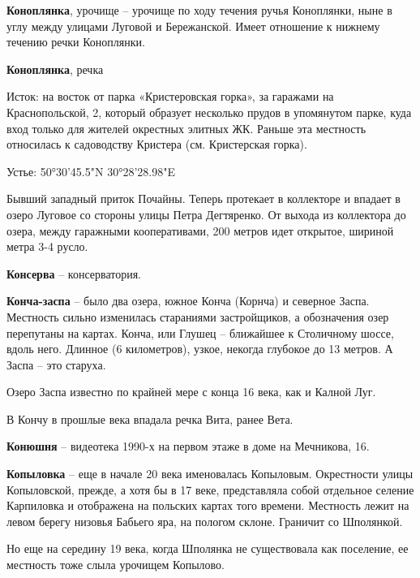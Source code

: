 \medskip

\textbf{Коноплянка}, урочище – урочище по ходу течения ручья Коноплянки, ныне в углу между улицами Луговой и Бережанской. Имеет отношение к нижнему течению речки Коноплянки.\\

\medskip

\textbf{Коноплянка}, речка

Исток: на восток от парка «Кристеровская горка», за гаражами на Краснопольской, 2, который образует несколько прудов в упомянутом парке, куда вход только для жителей окрестных элитных ЖК. Раньше эта местность относилась к садоводству Кристера (см. Кристерская горка).

Устье: 50°30'45.5"N 30°28'28.98"E

Бывший западный приток Почайны. Теперь протекает в коллекторе и впадает в озеро Луговое со стороны улицы Петра Дегтяренко. От выхода из коллектора до озера, между гаражными кооперативами, 200 метров идет открытое, шириной метра 3-4 русло.\\

\medskip

\textbf{Консерва} – консерватория.\\

\medskip

\textbf{Конча-заспа} – было два озера, южное Конча (Корнча) и северное Заспа. Местность сильно изменилась стараниями застройщиков, а обозначения озер перепутаны на картах. Конча, или Глушец – ближайшее к Столичному шоссе, вдоль него. Длинное (6 километров), узкое, некогда глубокое до 13 метров. А Заспа – это старуха.

Озеро Заспа известно по крайней мере с конца 16 века, как и Калной Луг.

В Кончу в прошлые века впадала речка Вита, ранее Вета.\\

\medskip

\textbf{Конюшня} – видеотека 1990-х на первом этаже в доме на Мечникова, 16.\\

\medskip

\textbf{Копыловка} – еще в начале 20 века именовалась Копыловым. Окрестности улицы Копыловской, прежде, а хотя бы в 17 веке, представляла собой отдельное селение Карпиловка и отображена на польских картах того времени. Местность лежит на левом берегу низовья Бабьего яра, на пологом склоне. Граничит со Шполянкой.

Но еще на середину 19 века, когда Шполянка не существовала как поселение, ее местность тоже слыла урочищем Копылово.

